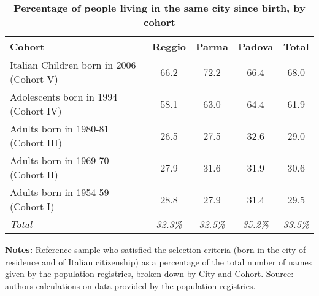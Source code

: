 \begin{table}[ht!]
\caption{\textbf{\small Percentage of people living in the same city since birth, by cohort}}
\label{tab:SameCity}
\begin{center}
\footnotesize
\begin{tabular}{ l c c c c }
\hline\hline
\textbf{Cohort} & \textbf{Reggio} & \textbf{Parma} & \textbf{Padova} & \textbf{Total}\\
\hline
Italian Children born in 2006 (Cohort V)   & 66.2  & 72.2  & 66.4  & 68.0 \\[0.2em]
Adolescents born in 1994 (Cohort IV)       & 58.1  & 63.0  & 64.4  & 61.9 \\[0.2em]
Adults born in 1980-81 (Cohort III)        & 26.5  & 27.5  & 32.6  & 29.0 \\[0.2em]
Adults born in 1969-70 (Cohort II)         & 27.9  & 31.6  & 31.9  & 30.6 \\[0.2em]
Adults born in 1954-59 (Cohort I)          & 28.8  & 27.9  & 31.4  & 29.5 \\[0.2em]
\hline
\textit{Total}         & \textit{32.3\%}  & \textit{32.5\%}  & \textit{35.2\%} & \textit{33.5\%} \\
\hline
\end{tabular}
\end{center}
\begin{flushleft}
\tiny{{\bfseries Notes:} Reference sample who satisfied the selection criteria (born in the city of residence and of Italian citizenship) as a percentage of the total number of names given by the population registries, broken down by City and Cohort. Source: authors calculations on data provided by the population registries.}
\end{flushleft}
\end{table}
